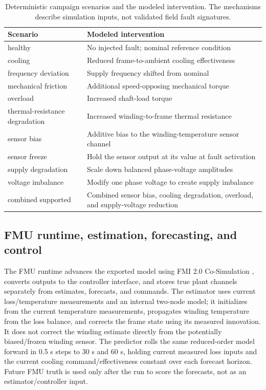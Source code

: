 \documentclass[machines,article,submit,moreauthors]{Definitions/mdpi}
\begin{document}
\begin{table}[H]
\caption{Deterministic campaign scenarios and the modeled intervention. The mechanisms describe simulation inputs, not validated field fault signatures.\label{tab:scenarios}}
\begin{tabularx}{\textwidth}{l X}
\toprule
\textbf{Scenario} & \textbf{Modeled intervention} \\
\midrule
healthy & No injected fault; nominal reference condition \\
cooling & Reduced frame-to-ambient cooling effectiveness \\
frequency deviation & Supply frequency shifted from nominal \\
mechanical friction & Additional speed-opposing mechanical torque \\
overload & Increased shaft-load torque \\
thermal-resistance degradation & Increased winding-to-frame thermal resistance \\
sensor bias & Additive bias to the winding-temperature sensor channel \\
sensor freeze & Hold the sensor output at its value at fault activation \\
supply degradation & Scale down balanced phase-voltage amplitudes \\
voltage imbalance & Modify one phase voltage to create supply imbalance \\
combined supported & Combined sensor bias, cooling degradation, overload, and supply-voltage reduction \\
\bottomrule
\end{tabularx}
\end{table}

\subsection{FMU runtime, estimation, forecasting, and control}

The FMU runtime advances the exported model using FMI 2.0 Co-Simulation \cite{fmi2020}, converts outputs to the controller interface, and stores true plant channels separately from estimates, forecasts, and commands. The estimator uses current loss/temperature measurements and an internal two-node model; it initializes from the current temperature measurements, propagates winding temperature from the loss balance, and corrects the frame state using its measured innovation. It does not correct the winding estimate directly from the potentially biased/frozen winding sensor. The predictor rolls the same reduced-order model forward in 0.5 s steps to 30 s and 60 s, holding current measured loss inputs and the current cooling command/effectiveness constant over each forecast horizon. Future FMU truth is used only after the run to score the forecasts, not as an estimator/controller input.
\end{document}
